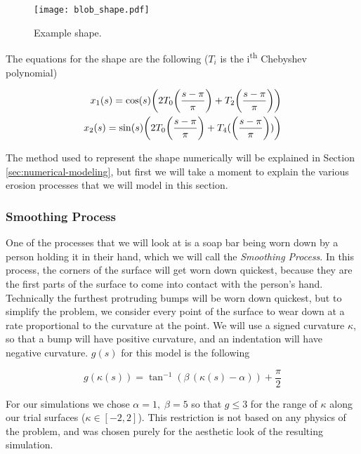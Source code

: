 \begin{figure}[H]
    \begin{center}
      \texttt{[image: blob\_shape.pdf]}
    \end{center}
  \vspace{-.2in} %
  \caption{\label{fig:blob-shape} Example shape.}
\end{figure}

The equations for the shape are the following ($T_i$ is the i\textsuperscript{th} Chebyshev polynomial)

\begin{align*}
  x_1(s) = \cos(s) \paren{2 T_0\paren{\frac{s-\pi}{\pi}} + T_2\paren{\frac{s-\pi}{\pi}}}\\
  x_2(s) = \sin(s) \paren{2 T_0\paren{\frac{s-\pi}{\pi}} + T_4(\paren{\frac{s-\pi}{\pi}})}
\end{align*}

The method used to represent the shape numerically will be explained in Section \ref{sec:numerical-modeling}, but first we will take a moment to explain the various erosion processes that we will model in this section.

\subsubsection*{Smoothing Process}

One of the processes that we will look at is a soap bar being worn down by a person holding it in their hand, which we will call the \textit{Smoothing Process}. In this process, the corners of the surface will get worn down quickest, because they are the first parts of the surface to come into contact with the person's hand. Technically the furthest protruding bumps will be worn down quickest, but to simplify the problem, we consider every point of the surface to wear down at a rate proportional to the curvature at the point. We will use a signed curvature $\kappa$, so that a bump will have positive curvature, and an indentation will have negative curvature. $g(s)$ for this model is the following

\begin{equation}
g(\kappa(s)) = \tan^{-1}(\beta \, (\kappa(s) - \alpha)) + \frac{\pi}{2}
\end{equation}

For our simulations we chose $\alpha = 1, \; \beta = 5$ so that $g \le 3$ for the range of $\kappa$ along our trial surfaces ($\kappa \in [-2, 2]$). This restriction is not based on any physics of the problem, and was chosen purely for the aesthetic look of the resulting simulation.

